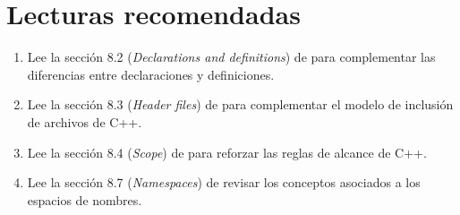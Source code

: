\section{Lecturas recomendadas}

\begin{enumerate}

\item Lee la sección 8.2 (\emph{Declarations and definitions}) 
      de \pppbook{}
      para complementar las diferencias entre declaraciones y definiciones.

\item Lee la sección 8.3 (\emph{Header files}) 
      de \pppbook{}
      para complementar el modelo de inclusión de archivos de C++.

\item Lee la sección 8.4 (\emph{Scope}) 
      de \pppbook{}
      para reforzar las reglas de alcance de C++.

\item Lee la sección 8.7 (\emph{Namespaces}) 
      de \pppbook{}
      revisar los conceptos asociados a los espacios de nombres.

\end{enumerate}

